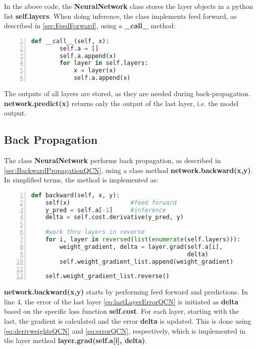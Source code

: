 In the above code, the \textbf{NeuralNetwork} class stores the layer objects in a python list \textbf{self.layers}. When doing inference, the class implements feed forward, as described in \cref{sec:FeedForward}, using a \textbf{\_call\_} method:
\begin{lstlisting}[language=python, numbers=left]
def __call__(self, x):
        self.a = []
        self.a.append(x)
        for layer in self.layers:
            x = layer(x)
            self.a.append(x)
\end{lstlisting}
The outputs of all layers are stored, as they are needed during back-propagation. \textbf{network.predict(x)} returns only the output of the last layer, i.e. the model output. 

\subsection{Back Propagation}\label{sec:BackpropImplementation}

The class \textbf{NeuralNetwork} performs back propagation, as described in \cref{sec:BackwardPropagationQCN}, using a class method \textbf{network.backward(x,y)}. In simplified terms, the method is implemented as:
\begin{lstlisting}[language=python, numbers=left]
def backward(self, x, y):
    self(x)                 #feed forward      
    y_pred = self.a[-1]     #inference
    delta = self.cost.derivative(y_pred, y)

    #work thru layers in reverse
    for i, layer in reversed(list(enumerate(self.layers))):
        weight_gradient, delta = layer.grad(self.a[i], 
                                            delta)
        self.weight_gradient_list.append(weight_gradient)

    self.weight_gradient_list.reverse()
\end{lstlisting}
\textbf{network.backward(x,y)} starts by performing feed forward and predictions. In line 4, the error of the last layer \cref{eq:lastLayerErrorQCN} is initiated as \textbf{delta} based on the specific loss function \textbf{self.cost}. For each layer, starting with the last, the gradient is calculated and the error \textbf{delta} is updated. This is done using \cref{eq:derivweightsQCN} and \cref{eq:errorQCN}, respectively, which is implemented in the layer method \textbf{layer.grad(self.a[i], delta)}.


